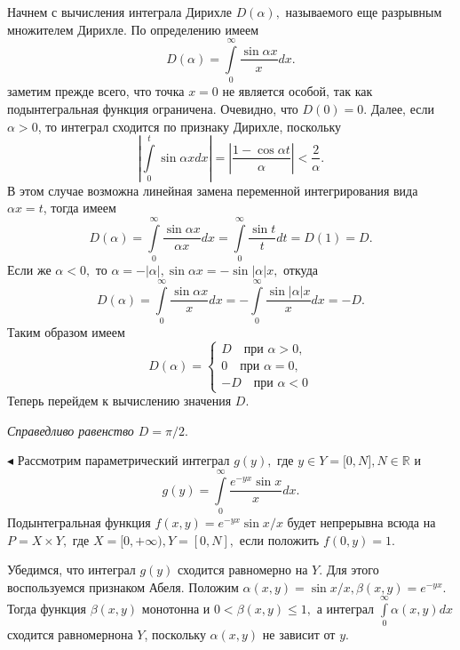 Начнем с вычисления интеграла Дирихле $D(\alpha),$ называемого еще разрывным множителем Дирихле. По определению имеем
$$ D(\alpha)=\int\limits_0^\infty \frac{\sin \alpha x}{x}dx.$$
заметим прежде всего, что точка $x=0$ не является особой, так как подынтегральная
функция ограничена. Очевидно, что $D(0)=0$. Далее, если $\alpha > 0$, то интеграл сходится по признаку Дирихле, поскольку
$$\left| \int\limits_0^t \sin\alpha xdx\right| =\left|\frac{1-\cos\alpha t}{\alpha}\right|<\frac2\alpha.$$
В этом случае возможна линейная замена переменной интегрирования вида $\alpha x=t$, тогда имеем
$$ D(\alpha) = \int\limits_0^\infty\frac{\sin\alpha x}{\alpha x}dx=\int\limits_0^\infty \frac{\sin t}{t}dt= D(1) = D.$$
Если же $\alpha<0,$ то $\alpha=-|\alpha|, \sin\alpha x=-\sin|\alpha| x,$ откуда
$$ D(\alpha) = \int\limits_0^\infty\frac{\sin\alpha x}{x}dx=-\int\limits_0^\infty \frac{\sin |\alpha| x}{x}dx=-D.$$
Таким образом имеем 
$$ D(\alpha)= 
\left\{\begin{array}{l} D \quad \mbox{при } \alpha>0,\\0 \quad \mbox{при } \alpha=0,\\
-D \quad \mbox{при } \alpha<0
\end{array}\right. $$
Теперь перейдем к вычислению значения $D$.
\medskip

\begin{theorem} \itshape Справедливо равенство $D = \pi/2.$\end{theorem}
\medskip

$\blacktriangleleft$ \upshape Рассмотрим параметрический интеграл $g(y),$ где $y\in Y = \lbrack0,N\rbrack, N\in \mathbb R$ и
$$ g(y) = \int\limits_0^\infty \frac{e^{-yx}\sin x}{x}dx.$$
Подынтегральная функция $f(x,y)=e^{-yx}\sin x/x$ будет непрерывна всюда на $ P = X\times Y,$ где $ X=[0,+\infty), Y=[0,N],$ если положить $f(0,y) = 1.$

Убедимся, что интеграл $g(y)$ сходится равномерно на $Y$. Для этого воспользуемся признаком Абеля. Положим $ \alpha(x,y)=\sin x/x, \beta(x,y)=e^{-yx}.$ Тогда функция $\beta(x,y)$ монотонна и $ 0<\beta(x,y)\le 1,$ а интеграл $\int\limits_0^\infty \alpha(x,y)dx $ сходится равномернона $Y$, поскольку $\alpha(x,y)$ не зависит от $y$.

